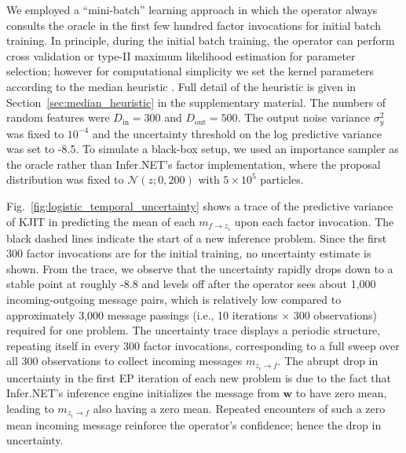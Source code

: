 \documentclass[english]{article}
\theoremstyle{plain}
\theoremstyle{plain}
\newcommand{\factor}{f}				%
\newcommand{\msg}[2]{m_{#1 \rightarrow #2}}			%
\newcommand{\figref}[1]{Fig.~\ref{#1}}
\newcommand{\secref}[1]{Section~\ref{#1}}
\begin{document}
We employed a ``mini-batch'' learning approach in which the operator always consults the oracle in
the first few hundred factor invocations for initial batch training. 
In principle, during the initial batch training, the operator can perform 
cross validation or type-II maximum likelihood estimation for parameter
selection; however for computational simplicity
we set the kernel parameters  according to the median heuristic
\citep{Scholkopf2002}. Full detail of the heuristic is given in
\secref{sec:median_heuristic} in the supplementary material. 
The numbers 
of random features were $D_\mathrm{in} = 300$ and $D_\mathrm{out} = 500$. The output noise variance 
$\sigma^2_y$ was fixed to $10^{-4}$ and the uncertainty threshold on the log 
predictive variance was set to -8.5. To simulate a black-box setup, we used
an importance sampler as the oracle rather than Infer.NET's factor implementation, 
where the proposal distribution was fixed to $\mathcal{N}(z; 0, 200)$ with 
$5 \times 10^5$ particles.

\figref{fig:logistic_temporal_uncertainty} shows a trace of the predictive variance 
of KJIT in predicting the mean of each $\msg{\factor}{z_i}$ upon each factor invocation. 
The black dashed lines indicate the start of a new inference problem. 
Since the first 300 factor invocations are for the initial training, 
no uncertainty estimate is shown. From the trace, we observe that the uncertainty 
rapidly drops down to a stable point at roughly -8.8 and levels 
off after the operator sees about 1,000 incoming-outgoing message pairs, 
which is relatively low compared to approximately 3,000 message passings 
(i.e., 10 iterations $\times$ 300 observations) required for one problem. 
The uncertainty trace displays a periodic structure, repeating itself in 
every 300 factor invocations, corresponding to a full sweep over all 300 
observations to collect incoming messages $\msg{z_i}{\factor}$. 
The abrupt drop in uncertainty in the first EP iteration of each new problem is 
due to the fact that Infer.NET's inference engine initializes the message from 
$\boldsymbol{w}$ to have zero mean, leading to $\msg{z_i}{\factor}$ also having a 
zero mean. Repeated encounters of such a zero mean incoming message reinforce the 
operator's confidence; hence the drop in uncertainty. 
\end{document}
